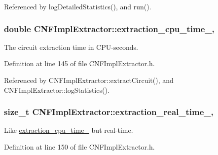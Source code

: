 Referenced by log\-Detailed\-Statistics(), and run().

\hypertarget{classCNFImplExtractor_ab8be06d42fd3c4b569ec22cfcf2f508e}{
\subsubsection[{extraction\-\_\-cpu\-\_\-time\-\_\-}]{\setlength{\rightskip}{0pt plus 5cm}double C\-N\-F\-Impl\-Extractor\-::extraction\-\_\-cpu\-\_\-time\-\_\-\hspace{0.3cm}{\ttfamily [protected]}, {\ttfamily [inherited]}}}\label{classCNFImplExtractor_ab8be06d42fd3c4b569ec22cfcf2f508e}


The circuit extraction time in C\-P\-U-\/seconds. 



Definition at line 145 of file C\-N\-F\-Impl\-Extractor.\-h.



Referenced by C\-N\-F\-Impl\-Extractor\-::extract\-Circuit(), and C\-N\-F\-Impl\-Extractor\-::log\-Statistics().

\hypertarget{classCNFImplExtractor_ae06413cf08f868357d64545b3041aa18}{
\subsubsection[{extraction\-\_\-real\-\_\-time\-\_\-}]{\setlength{\rightskip}{0pt plus 5cm}size\-\_\-t C\-N\-F\-Impl\-Extractor\-::extraction\-\_\-real\-\_\-time\-\_\-\hspace{0.3cm}{\ttfamily [protected]}, {\ttfamily [inherited]}}}\label{classCNFImplExtractor_ae06413cf08f868357d64545b3041aa18}


Like \hyperlink{classCNFImplExtractor_ab8be06d42fd3c4b569ec22cfcf2f508e}{extraction\-\_\-cpu\-\_\-time\-\_\-} but real-\/time. 



Definition at line 150 of file C\-N\-F\-Impl\-Extractor.\-h.



